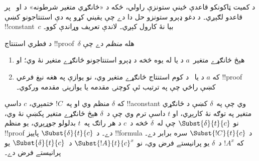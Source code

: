 \documentclass[../../../include/open-logic-section]{subfiles}
\begin{document}


د کميت ټاکونکو قاعدې ځينې ستونزې راولي، ځکه د «ځانګړي متغير
شرطونه» د \Elim{\lexists} او~\Intro{\lforall} پر قاعدو لګېږي۔
د دغو ډېرو ستونزو حل دا دے چې يقيني کړو په دې استنتاجونو کښې
!!{constant}~$c$ بيا نۀ کارول کېږي۔ لاندې تعريف وړاندې کوو۔

\begin{defn}
د فطري استنتاج !!{proof}~$\delta$ هله \emph{منظم} دے چې
\begin{enumerate}
  \item هېڅ ځانګړے متغير~$a$ د \Elim{\lexists} يا
  \Intro{\lforall} له يوه څخه د ډېرو استنتاجونو ځانګړے متغير نۀ وي؛ او
  \item که $a$ د \Elim{\lexists} يا~\Intro{\lforall} د کوم
  استنتاج ځانګړے متغير وي، نو يوازې په هغه نېغ فرعي !!{proof} کښې
  راځي چې په ترتيب ئې کوچنۍ مقدمه يا يوازېنۍ مقدمه ورکوي۔
\end{enumerate}
\end{defn}

\begin{lem}
که $\delta$ منظم وي او په~$!C$ ختمېږي، $c$ داسې !!a{constant}
وي چې په~$\delta$ کښې د ځانګړي متغير په توګه نۀ کارېږي، او
$t$ داسې ترم وي چې د~$\delta$ هېڅ ځانګړے متغير پکښې نۀ وي،
نو $\Subst{\delta}{t}{c}$ چې له~$\delta$ څخه د~$c$ د هر راتګ په~$t$
بدلولو جوړېږي، يو منظم !!{proof} دے۔ د $\Subst{\delta}{t}{c}$ پاييز
!!{formula} د $\Subst{!C}{t}{c}$ سره برابر دے۔ که $!A^x$ د~$\delta$
يو پرانيستے فرض وي، نو $\Subst{!A}{t}{c}^x$ د~$\Subst{\delta}{t}{c}$ يو پرانيستے فرض دے۔
\end{lem}
\end{document}
